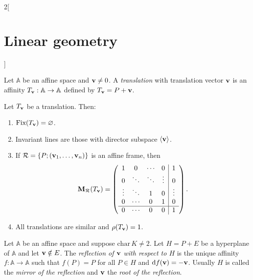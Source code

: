\documentclass[../../../main.tex]{subfiles}
\begin{document}
\begin{multicols}{2}[\section{Linear geometry}]
\begin{definition}
  \end{definition}
  \begin{definition}[Translations]
    Let $\mathbb{A}$ be an affine space and $\boldsymbol{\mathrm{v}}\ne 0$. A \textit{translation} with translation vector $\boldsymbol{\mathrm{v}}$ is an affinity $T_{\boldsymbol{\mathrm{v}}}:\mathbb{A}\rightarrow\mathbb{A}$ defined by $T_{\boldsymbol{\mathrm{v}}}=P+\boldsymbol{\mathrm{v}}$.
  \end{definition}
  \begin{prop}
    Let $T_{\boldsymbol{\mathrm{v}}}$ be a translation. Then:
    \begin{enumerate}
      \item $\text{Fix}(T_{\boldsymbol{\mathrm{v}}})=\varnothing$.
      \item Invariant lines are those with director subspace $\langle\boldsymbol{\mathrm{v}}\rangle$.
      \item If $\mathcal{R}=\{P;(\boldsymbol{\mathrm{v}}_1,\ldots,\boldsymbol{\mathrm{v}}_n)\}$ is an affine frame, then $$\boldsymbol{\mathrm{M}}_\mathcal{R}(T_{\boldsymbol{\mathrm{v}}})=\left(\begin{array}{cccc|c}
                  1      & 0      & \cdots & 0      & 1      \\
                  0      & \ddots & \ddots & \vdots & 0      \\
                  \vdots & \ddots & 1      & 0      & \vdots \\
                  0      & \cdots & 0      & 1      & 0      \\
                  \hline
                  0      & \cdots & 0      & 0      & 1
                \end{array}\right).$$
      \item All translations are similar and $\rho(T_{\boldsymbol{\mathrm{v}}})=1$.
    \end{enumerate}
  \end{prop}
  \begin{definition}[Reflections]
    Let $\mathbb{A}$ be an affine space and suppose $\text{char}\,K\ne 2$. Let $H=P+E$ be a hyperplane of $\mathbb{A}$ and let $\boldsymbol{\mathrm{v}}\notin E$. The \textit{reflection of $\boldsymbol{\mathrm{v}}$ with respect to $H$} is the unique affinity $f:\mathbb{A}\rightarrow\mathbb{A}$ such that $f(P)=P$ for all $P\in H$ and $\dd f(\boldsymbol{\mathrm{v}})=-\boldsymbol{\mathrm{v}}$. Usually $H$ is called the \textit{mirror of the reflection} and $\boldsymbol{\mathrm{v}}$ the \textit{root of the reflection}.
  \end{definition}

\end{multicols}
\end{document}
